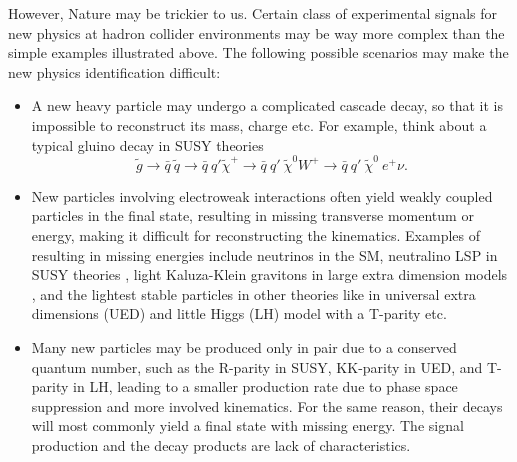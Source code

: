 \documentclass[12pt,prd,aps,floats,preprintnumbers,preprint,superscriptaddress,floatfix,nofootinbib]{revtex4}
\begin{document}
However, Nature may be trickier to us. Certain class of 
experimental signals for new physics at  hadron collider environments
may be way more complex than the simple examples illustrated above.
The following possible scenarios may make the new physics identification
difficult:
\begin{itemize}
\item A new heavy particle may undergo a complicated cascade decay, 
so that it is impossible to reconstruct its mass, charge etc. For example, think
about a typical gluino decay \cite{cascade} in SUSY theories 
$$\tilde g\to \bar q\ \tilde q \to \bar q\ q' \tilde\chi^+ \to \bar q\ q' \ \tilde\chi^0 W^+ 
\to \bar q\ q'  \ \tilde\chi^0\ e^+ \nu.$$
\item New particles involving electroweak interactions often yield weakly
coupled particles in the final state, resulting in missing transverse momentum
or energy, making it difficult for reconstructing the kinematics. 
Examples of resulting in missing energies 
include neutrinos in the SM, neutralino LSP in SUSY theories \cite{HaberKane}, 
light Kaluza-Klein gravitons in large extra dimension models \cite{GRW-HLZ},
and the lightest stable particles in other theories like in universal extra dimensions
(UED) \cite{UED} and little Higgs (LH) model with a T-parity \cite{T-P} etc.
\item Many new particles may be produced only in pair due to a conserved quantum
number, such as the R-parity in SUSY, KK-parity in UED, and T-parity in LH,
leading to a smaller production rate due to phase space suppression 
and more involved kinematics. 
For the same reason, their decays will most commonly yield a  final state
with missing energy. The signal production and the decay products are
 lack of characteristics.
\end{itemize}
\end{document}
